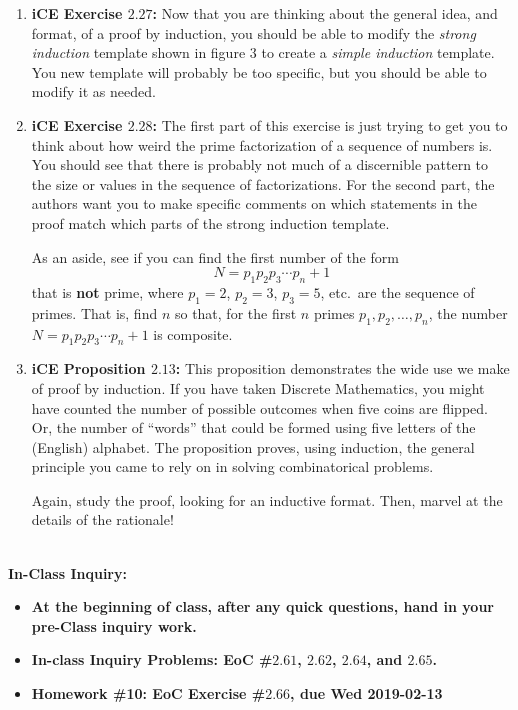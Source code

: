 \documentclass[12pt,letterpaper]{article}
\theoremstyle{definition}
\begin{document}
\begin{enumerate}
    \item {\bfseries iCE Exercise $2.27$:} Now that you are thinking about the general idea, and format, of a proof by induction, you should be able to modify the \textit{strong induction} template shown in figure $3$ to create a \textit{simple induction} template. You new template will probably be too specific, but you should be able to modify it as needed.
    
    \item {\bfseries iCE Exercise $2.28$:} The first part of this exercise is just trying to get you to think about how weird the prime factorization of a sequence of numbers is. You should see that there is probably not much of a discernible pattern to the size or values in the sequence of factorizations. For the second part, the authors want you to make specific comments on which statements in the proof match which parts of the strong induction template.
    
    As an aside, see if you can find the first number of the form
    \[
     N= p_1p_2p_3\cdots p_n +1
    \]
    that is \textbf{not} prime, where $p_1=2$, $p_2=3$, $p_3=5$, etc.~are the sequence of primes. That is, find $n$ so that, for the first $n$ primes
    $p_1,p_2,\ldots,p_n$, the number $N=p_1p_2p_3\cdots p_n +1$ is composite.
    
    \item {\bfseries iCE Proposition $2.13$:} This proposition demonstrates the wide use we make of proof by induction. If you have taken Discrete Mathematics, you might have counted the number of possible outcomes when five coins are flipped. Or, the number of ``words'' that could be formed using five letters of the (English) alphabet. The proposition proves, using induction, the general principle you came to rely on in solving combinatorical problems.
    
    Again, study the proof, looking for an inductive format. Then, marvel at the details of the rationale!
    
\end{enumerate}


\hrulefill\\

\textbf{\large In-Class Inquiry:}
\begin{itemize}
    \item \textbf{At the beginning of class, after any quick questions, hand in your pre-Class inquiry work.}
    
    \item \textbf{In-class Inquiry Problems: EoC \#$2.61$, $2.62$, 
    $2.64$, and $2.65$.}
    
    \item \textbf{Homework \#10: EoC Exercise \#$2.66$, due Wed 2019-02-13}
          
\end{itemize}
\end{document}
